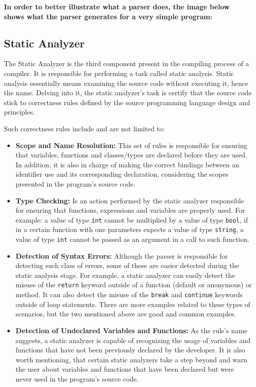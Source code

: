 \textbf{In order to better illustrate what a parser does, the image below shows what the parser generates for a very simple program:}

\subsection{Static Analyzer}
The Static Analyzer is the third component present in the compiling process of a compiler. It is responsible for performing a task called static analysis. Static analysis essentially means examining the source code without executing it, hence the name. Delving into it, the static analyzer's task is certify that the source code stick to correctness rules defined by the source programming language design and principles.

Such correctness rules include and are not limited to:
\begin{itemize}
    \item \textbf{Scope and Name Resolution:} This set of rules is responsible for ensuring that variables, functions and classes/types are declared before they are used. In addition, it is also in charge of making the correct bindings between an identifier use and its corresponding declaration, considering the scopes presented in the program's source code.
    
    \item \textbf{Type Checking:} Is an action performed by the static analyzer responsible for ensuring that functions, expressions and variables are properly used. For example: a value of type \texttt{int} cannot be multiplied by a value of type \texttt{bool}, if in a certain function with one parameters expects a value of type \texttt{string}, a value of type \texttt{int} cannot be passed as an argument in a call to such function.
    
    \item \textbf{Detection of Syntax Errors:} Although the parser is responsible for detecting such class of errors, some of these are easier detected during the static analysis stage. For example, a static analyzer can easily detect the misuse of the \texttt{return} keyword outside of a function (default or anonymous) or method. It can also detect the misuse of the \texttt{break} and \texttt{continue} keywords outside of loop statements. There are more examples related to these types of scenarios, but the two mentioned above are good and common examples.
    
    \item \textbf{Detection of Undeclared Variables and Functions:} As the rule's name suggests, a static analyzer is capable of recognizing the usage of variables and functions that have not been previously declared by the developer. It is also worth mentioning, that certain static analyzers take a step beyond and warn the user about variables and functions that have been declared but were never used in the program's source code.
\end{itemize}

